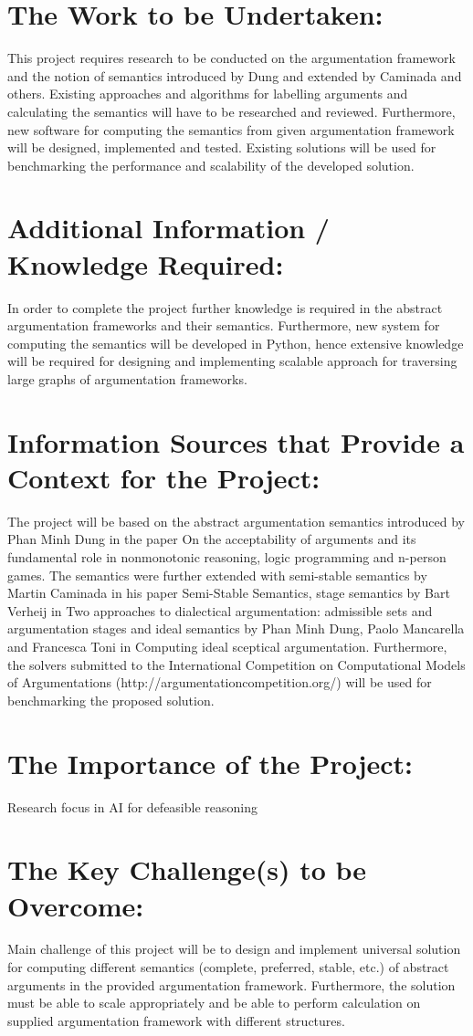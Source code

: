 \section{The Work to be Undertaken:}
This project requires research to be conducted on the argumentation framework and the notion of semantics introduced by Dung and extended by Caminada and others. Existing approaches and algorithms for labelling arguments and calculating the semantics will have to be researched and reviewed. Furthermore, new software for computing the semantics from given argumentation framework will be designed, implemented and tested. Existing solutions will be used for benchmarking the performance and scalability of the developed solution.

\section{Additional Information / Knowledge Required:}
In order to complete the project further knowledge is required in the abstract argumentation frameworks and their semantics. Furthermore, new system for computing the semantics will be developed in Python, hence extensive knowledge will be required for designing and implementing scalable approach for traversing large graphs of argumentation frameworks. 

\section{Information Sources that Provide a Context for the Project:}
The project will be based on the abstract argumentation semantics introduced by Phan Minh Dung in the paper On the acceptability of arguments and its fundamental role in nonmonotonic reasoning, logic programming and n-person games. The semantics were further extended with semi-stable semantics by Martin Caminada in his paper Semi-Stable Semantics, stage semantics by Bart Verheij in Two approaches to dialectical argumentation: admissible sets and argumentation stages and ideal semantics by Phan Minh Dung, Paolo Mancarella and Francesca Toni in Computing ideal sceptical argumentation. Furthermore, the solvers submitted to the International Competition on Computational Models of Argumentations (http://argumentationcompetition.org/) will be used for benchmarking the proposed solution. 

\section{The Importance of the Project:}
Research focus in AI for defeasible reasoning

\section{The Key Challenge(s) to be Overcome:}
Main challenge of this project will be to design and implement universal solution for computing different semantics (complete, preferred, stable, etc.) of abstract arguments in the provided argumentation framework. Furthermore, the solution must be able to scale appropriately and be able to perform calculation on supplied argumentation framework with different structures.
